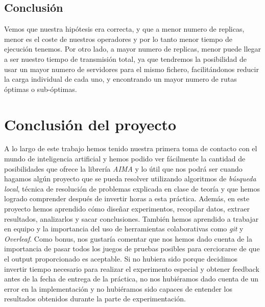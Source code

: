 \documentclass[a4paper,10pt]{report}
\begin{document}
		\subsection*{Conclusión}
		Vemos que nuestra hipótesis era correcta, y que a menor numero de replicas, menor es el coste de nuestros operadores y por lo tanto menor tiempo de ejecución tenemos. Por otro lado, a mayor numero de replicas, menor puede llegar a ser nuestro tiempo de transmisión total, ya que tendremos la posibilidad de usar un mayor numero de servidores para el mismo fichero, facilitándonos reducir la carga individual de cada uno, y encontrando un mayor numero de rutas óptimas o sub-óptimas.
		
	\newpage
	\section*{Conclusión del proyecto}
    A lo largo de este trabajo hemos tenido nuestra primera toma de contacto con el mundo de inteligencia artificial y hemos podido ver fácilmente la cantidad de posibilidades que ofrece la librería \textit{AIMA} y lo útil que nos podrá ser cuando hagamos algún proyecto que se pueda resolver utilizando algoritmos de \textit{búsqueda local}, técnica de resolución de problemas explicada en clase de teoría y que hemos logrado comprender después de invertir horas a esta práctica.\newline
    Además, en este proyecto hemos aprendido cómo diseñar experimentos, recopilar datos, extraer resultados, analizarlos y sacar conclusiones. También hemos aprendido a trabajar en equipo y la importancia del uso de herramientas colaborativas como \textit{git} y \textit{Overleaf}.\newline\newline
	Como bonus, nos gustaría comentar que nos hemos dado cuenta de la importancia de pasar todos los juegos de pruebas posibles para cerciorarse de que el output proporcionado es aceptable. Si no hubiera sido porque decidimos invertir tiempo necesario para realizar el experimento especial y obtener feedback antes de la fecha de entrega de la práctica, no nos hubiéramos dado cuenta de un error en la implementación y no hubiéramos sido capaces de entender los resultados obtenidos durante la parte de experimentación.	        
\end{document}
